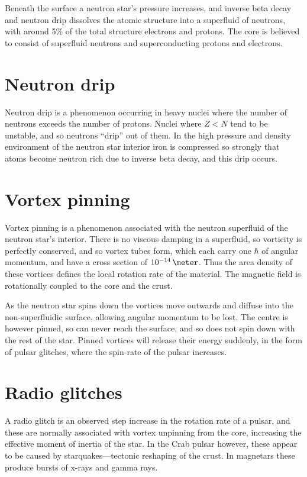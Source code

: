    

Beneath the surface a neutron star's pressure increases, and inverse
beta decay and neutron drip dissolves the atomic structure into a
superfluid of neutrons, with around 5\% of the total structure
electrons and protons. The core is believed to consist of superfluid
neutrons and superconducting protons and electrons.

\section{Neutron drip}
\label{sec:neutron-drip}

Neutron drip is a phenomenon occurring in heavy nuclei where the
number of neutrons exceeds the number of protons. Nuclei where $Z<N$
tend to be unstable, and so neutrons ``drip'' out of them. In the high
pressure and density environment of the neutron star interior iron is
compressed so strongly that atoms become neutron rich due to inverse
beta decay, and this drip occurs.

\section{Vortex pinning}
\label{sec:vortex-pinning}

Vortex pinning is a phenomenon associated with the neutron superfluid
of the neutron star's interior.  There is no viscous damping in a
superfluid, so vorticity is perfectly conserved, and so vortex tubes
form, which each carry one $\hbar$ of angular momentum, and have a
cross section of $10^{-14}\,\meter$. Thus the area density of these
vortices defines the local rotation rate of the material. The magnetic
field is rotationally coupled to the core and the crust.

As the neutron star spins down the vortices move outwards and diffuse
into the non-superfluidic surface, allowing angular momentum to be
lost. The centre is however pinned, so can never reach the surface,
and so does not spin down with the rest of the star. Pinned vortices
will release their energy suddenly, in the form of pulsar glitches,
where the spin-rate of the pulsar increases.

\section{Radio glitches}
\label{sec:radio-glitches}

A radio glitch is an observed step increase in the rotation rate of a
pulsar, and these are normally associated with vortex unpinning from
the core, increasing the effective moment of inertia of the star. In
the Crab pulsar however, these appear to be caused by
starquakes---tectonic reshaping of the crust. In magnetars these
produce bursts of x-rays and gamma rays.



 